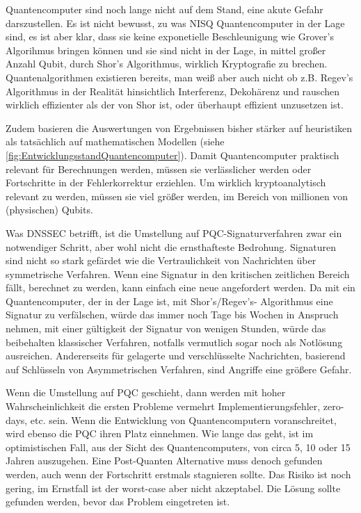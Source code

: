 \label{chapter-fazit}

Quantencomputer sind noch lange nicht auf dem Stand, eine akute Gefahr darszustellen.
Es ist nicht bewusst, zu was NISQ Quantencomputer in der Lage sind, es ist aber klar, dass sie keine exponetielle Beschleunigung wie Grover's Algorihmus bringen können
und sie sind nicht in der Lage, in mittel großer Anzahl Qubit, durch Shor's Algorithmus, wirklich Kryptografie zu brechen.
Quantenalgorithmen existieren bereits, man weiß aber auch nicht ob z.B. Regev's Algorithmus in der Realität hinsichtlich Interferenz, Dekohärenz und rauschen wirklich effizienter als der von Shor ist, oder überhaupt effizient unzusetzen ist.

Zudem basieren die Auswertungen von Ergebnissen bisher stärker auf heuristiken als tatsächlich auf mathematischen Modellen (siehe \ref{fig:EntwicklungsstandQuantencomputer}).
Damit Quantencomputer praktisch relevant für Berechnungen werden, müssen sie verlässlicher werden oder Fortschritte in der Fehlerkorrektur erziehlen.
Um wirklich kryptoanalytisch relevant zu werden, müssen sie viel größer werden, im Bereich von millionen von (physischen) Qubits.

Was DNSSEC betrifft, ist die Umstellung auf PQC-Signaturverfahren zwar ein notwendiger Schritt, aber wohl nicht die ernsthafteste Bedrohung.
Signaturen sind nicht so stark gefärdet wie die Vertraulichkeit von Nachrichten über symmetrische Verfahren.
Wenn eine Signatur in den kritischen zeitlichen Bereich fällt, berechnet zu werden, kann einfach eine neue angefordert werden.
Da mit ein Quantencomputer, der in der Lage ist, mit Shor's/Regev's-  Algorithmus eine Signatur zu verfälschen, würde das immer noch Tage bis Wochen in Anspruch nehmen,
mit einer gültigkeit der Signatur von wenigen Stunden, würde das beibehalten klassischer Verfahren, notfalls vermutlich sogar noch als Notlösung ausreichen.
Andererseits für gelagerte und verschlüsselte Nachrichten, basierend auf Schlüsseln von Asymmetrischen Verfahren, sind Angriffe eine größere Gefahr.

Wenn die Umstellung auf PQC geschieht, dann werden mit hoher Wahrscheinlichkeit die ersten Probleme vermehrt Implementierungsfehler, zero-days, etc. sein.
Wenn die Entwicklung von Quantencomputern voranschreitet, wird ebenso die PQC ihren Platz einnehmen.
Wie lange das geht, ist im optimistischen Fall, aus der Sicht des Quantencomputers, von circa 5, 10 oder 15 Jahren auszugehen.
Eine Post-Quanten Alternative muss denoch gefunden werden, auch wenn der Fortschritt erstmals stagnieren sollte.
Das Risiko ist noch gering, im Ernstfall ist der worst-case aber nicht akzeptabel.
Die Lösung sollte gefunden werden, bevor das Problem eingetreten ist.